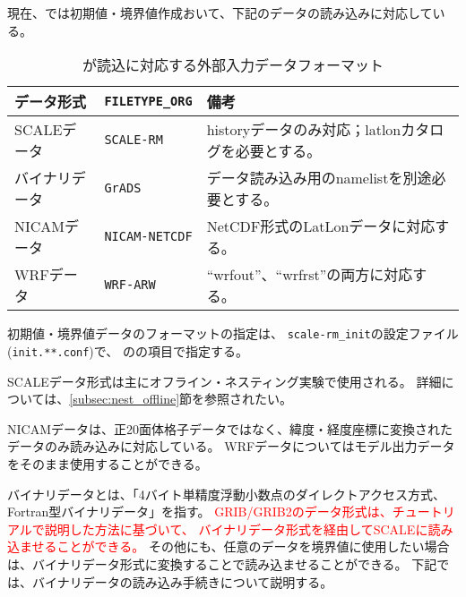 \section{\SecAdvanceInputDataSetting} \label{sec:adv_datainput}

現在、\scalerm では初期値・境界値作成おいて、下記のデータの読み込みに対応している。

\begin{table}[htb]
\begin{center}
\caption{\scalelib が読込に対応する外部入力データフォーマット}
\begin{tabularx}{150mm}{|l|l|X|} \hline
 \rowcolor[gray]{0.9} データ形式      & \verb|FILETYPE_ORG|  & 備考 \\ \hline
 SCALEデータ    & \verb|SCALE-RM|     & historyデータのみ対応；latlonカタログを必要とする。 \\ \hline
 バイナリデータ & \verb|GrADS|        & データ読み込み用のnamelistを別途必要とする。 \\ \hline
 NICAMデータ    & \verb|NICAM-NETCDF| & NetCDF形式のLatLonデータに対応する。 \\ \hline
 WRFデータ      & \verb|WRF-ARW|      & ``wrfout''、``wrfrst''の両方に対応する。 \\ \hline
\end{tabularx}
\label{tab:inputdata_format}
\end{center}
\end{table}


初期値・境界値データのフォーマットの指定は、
\verb|scale-rm_init|の設定ファイル(\verb|init.**.conf|)で、
のの項目で指定する。

SCALEデータ形式は主にオフライン・ネスティング実験で使用される。
詳細については、\ref{subsec:nest_offline}節を参照されたい。

NICAMデータは、正20面体格子データではなく、緯度・経度座標に変換されたデータのみ読み込みに対応している。
WRFデータについてはモデル出力データをそのまま使用することができる。

バイナリデータとは、「4バイト単精度浮動小数点のダイレクトアクセス方式、Fortran型バイナリデータ」を指す。
\textcolor{red}{GRIB/GRIB2のデータ形式は、チュートリアルで説明した方法に基づいて、
バイナリデータ形式を経由してSCALEに読み込ませることができる。}
その他にも、任意のデータを境界値に使用したい場合は、バイナリデータ形式に変換することで読み込ませることができる。
下記では、バイナリデータの読み込み手続きについて説明する。


\subsection{\SecAdvanceInputDataSetting} \label{sec:adv_datainput}






